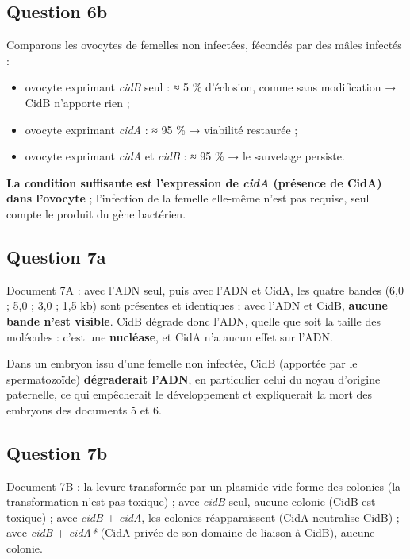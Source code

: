\documentclass[11pt,a4paper]{article}
\providecommand{\tightlist}{\setlength{\itemsep}{0pt}\setlength{\parskip}{0pt}}
\begin{document}
\hypertarget{question-6b}{%
\subsection{Question 6b}\label{question-6b}}

Comparons les ovocytes de femelles non infectées, fécondés par des mâles infectés :

\begin{itemize}
\tightlist
\item
  ovocyte exprimant \emph{cidB} seul : ≈ 5 \% d'éclosion, comme sans modification → CidB n'apporte rien ;
\item
  ovocyte exprimant \emph{cidA} : ≈ 95 \% → viabilité restaurée ;
\item
  ovocyte exprimant \emph{cidA} et \emph{cidB} : ≈ 95 \% → le sauvetage persiste.
\end{itemize}

\textbf{La condition suffisante est l'expression de \emph{cidA} (présence de CidA) dans l'ovocyte} ; l'infection de la femelle elle-même n'est pas requise, seul compte le produit du gène bactérien.

\hypertarget{question-7a}{%
\subsection{Question 7a}\label{question-7a}}

Document 7A : avec l'ADN seul, puis avec l'ADN et CidA, les quatre bandes (6,0 ; 5,0 ; 3,0 ; 1,5 kb) sont présentes et identiques ; avec l'ADN et CidB, \textbf{aucune bande n'est visible}. CidB dégrade donc l'ADN, quelle que soit la taille des molécules : c'est une \textbf{nucléase}, et CidA n'a aucun effet sur l'ADN.

Dans un embryon issu d'une femelle non infectée, CidB (apportée par le spermatozoïde) \textbf{dégraderait l'ADN}, en particulier celui du noyau d'origine paternelle, ce qui empêcherait le développement et expliquerait la mort des embryons des documents 5 et 6.

\hypertarget{question-7b}{%
\subsection{Question 7b}\label{question-7b}}

Document 7B : la levure transformée par un plasmide vide forme des colonies (la transformation n'est pas toxique) ; avec \emph{cidB} seul, aucune colonie (CidB est toxique) ; avec \emph{cidB} + \emph{cidA}, les colonies réapparaissent (CidA neutralise CidB) ; avec \emph{cidB} + \emph{cidA*} (CidA privée de son domaine de liaison à CidB), aucune colonie.
\end{document}
